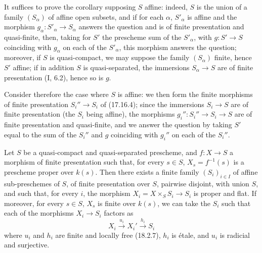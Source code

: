 It suffices to prove the corollary supposing $S$ affine: indeed, $S$ is the union of a family $(S_\alpha)$ of affine open subsets, and if for each $\alpha$, $S'_\alpha$ is affine and the morphism $g_\alpha:S'_\alpha\to S_\alpha$ answers the question and is of finite presentation and quasi-finite, then, taking for $S'$ the prescheme sum of the $S'_\alpha$, with $g:S'\to S$ coinciding with $g_\alpha$ on each of the $S'_\alpha$, this morphism answers the question; moreover, if $S$ is quasi-compact, we may suppose the family $(S_\alpha)$ finite, hence $S'$ affine; if in addition $S$ is quasi-separated, the immersions $S_\alpha\to S$ are of finite presentation (I, 6.2), hence so is $g$.

Consider therefore the case where $S$ is affine: we then form the finite morphisms of finite presentation $S_i''\to S_i$ of (17.16.4); since the immersions $S_i\to S$ are of finite presentation (the $S_i$ being affine), the morphisms $g_i'':S_i''\to S_i\to S$ are of finite presentation and quasi-finite, and we answer the question by taking $S'$ equal to the sum of the $S_i''$ and $g$ coinciding with $g_i''$ on each of the $S_i''$.

\begin{proposition}[17.16.6]
\label{IV.17.16.6}
Let $S$ be a quasi-compact and quasi-separated prescheme, and $f:X\to S$ a morphism of finite presentation such that, for every $s\in S$, $X_s=f^{-1}(s)$ is a prescheme proper over $k(s)$. Then there exists a finite family $(S_i)_{i\in I}$ of affine sub-preschemes of $S$, of finite presentation over $S$, pairwise disjoint, with union $S$, and such that, for every $i$, the morphism $X_i=X\times_S S_i\to S_i$ is proper and flat. If moreover, for every $s\in S$, $X_s$ is finite over $k(s)$, we can take the $S_i$ such that each of the morphisms $X_i\to S_i$ factors as
\[
  X_i\xrightarrow{u_i}X_i'\xrightarrow{h_i}S_i
\]
where $u_i$ and $h_i$ are finite and locally free (18.2.7), $h_i$ is étale, and $u_i$ is radicial and surjective.
\end{proposition}

